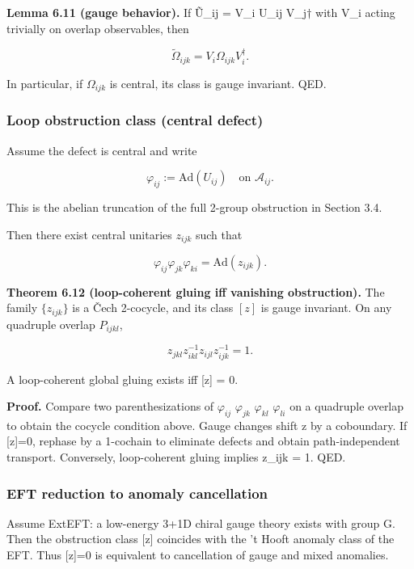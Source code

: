 \documentclass[11pt,a4paper]{article}
\theoremstyle{remark}
\begin{document}
\textbf{Lemma 6.11 (gauge behavior).} If \~{U}\_ij = V\_i U\_ij V\_j\ensuremath{\dagger} with V\_i
acting trivially on overlap observables, then

\[
\tilde{\Omega}_{ijk} = V_i \Omega_{ijk} V_i^\dagger.
\]

In particular, if $\Omega_{ijk}$ is central, its class is gauge invariant. QED.

\subsubsection{Loop obstruction class (central defect)}\label{loop-obstruction-class-central-defect-1}

Assume the defect is central and write

\[
\varphi_{ij} := \mathrm{Ad}(U_{ij}) \quad \text{on } \mathcal{A}_{ij}.
\]

This is the abelian truncation of the full 2-group obstruction in Section 3.4.

Then there exist central unitaries \(z_{ijk}\) such that

\[
\varphi_{ij} \varphi_{jk} \varphi_{ki} = \mathrm{Ad}(z_{ijk}).
\]

\textbf{Theorem 6.12 (loop-coherent gluing iff vanishing obstruction).} The family
\(\{z_{ijk}\}\) is a \v{C}ech 2-cocycle, and its class \([z]\) is gauge invariant. On any
quadruple overlap \(P_{ijkl}\),

\[
z_{jkl} z_{ikl}^{-1} z_{ijl} z_{ijk}^{-1} = 1.
\]

A loop-coherent global gluing exists iff {[}z{]} = 0.

\textbf{Proof.} Compare two parenthesizations of
$\varphi_{ij}$ $\varphi_{jk}$ $\varphi_{kl}$ $\varphi_{li}$ on a quadruple overlap to
obtain the cocycle condition above. Gauge changes shift z by a coboundary.
If {[}z{]}=0, rephase by a 1-cochain to eliminate defects and obtain
path-independent transport. Conversely, loop-coherent gluing implies
z\_ijk = 1. QED.

\subsubsection{EFT reduction to anomaly cancellation}\label{eft-reduction-to-anomaly-cancellation}

Assume ExtEFT: a low-energy 3+1D chiral gauge theory exists with group G.
Then the obstruction class {[}z{]} coincides with the 't Hooft anomaly class of
the EFT. Thus {[}z{]}=0 is equivalent to cancellation of gauge and mixed
anomalies.
\end{document}
